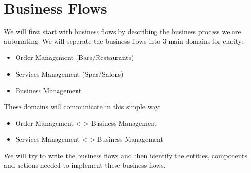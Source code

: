 \documentclass[]{VUMIFTemplateClass}
\begin{document}
\section{Business Flows}

We will first start with business flows by describing the business process we are automating. We will
seperate the business flows into 3 main domains for clarity:
\begin{itemize}
    \item Order Management (Bars/Restaurants)
    \item Services Management (Spas/Salons)
    \item Business Management
\end{itemize}
These domains will communicate in this simple way:
\begin{itemize}
    \item Order Management <-> Business Management
    \item Services Management <-> Business Management
\end{itemize}

We will try to write the business flows and then identify the entities,
components and actions needed to implement these business flows.




\end{document}

